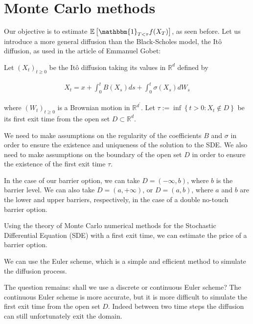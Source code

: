 \section{Monte Carlo methods}

Our objective is to estimate $\mathbb{E}\left[\mathbbm{1}_{T < \tau} f(X_T)\right]$, as seen before.
Let us introduce a more general diffusion than the Black-Scholes model, the Itô diffusion, as used in the article of Emmanuel Gobet:

Let $\left(X_{t}\right)_{t \geq 0}$ be the Itô diffusion taking its values in $\mathbb{R}^{d}$ defined by

$$
\begin{aligned}
X_{t}=x+\int_{0}^{t} B\left(X_{s}\right) d s+\int_{0}^{t} \sigma\left(X_{s}\right) d W_{s}
\end{aligned}
$$

where $\left(W_{t}\right)_{t \geq 0}$ is a Brownian motion in $\mathbb{R}^{d^{\prime}}$. Let $\tau:=\inf \left\{t>0: X_{t} \notin D\right\}$ be its first exit time from the open set $D \subset \mathbb{R}^{d}$. 

We need to make assumptions on the regularity of the coefficients $B$ and $\sigma$ in order to ensure the existence and uniqueness of the solution to the SDE. We also need to make assumptions on the boundary of the open set $D$ in order to ensure the existence of the first exit time $\tau$.

In the case of our barrier option, we can take $D = (-\infty, b)$, where $b$ is the barrier level. We can also take $D = (a, +\infty)$, or $D = (a, b)$, where $a$ and $b$ are the lower and upper barriers, respectively, in the case of a double no-touch barrier option.


Using the theory of Monte Carlo numerical methods for the Stochastic Differential Equation (SDE) with a first exit time, we can estimate the price of a barrier option.

We can use the Euler scheme, which is a simple and efficient method to simulate the diffusion process.

The question remains: shall we use a discrete or continuous Euler scheme? The continuous Euler scheme is more accurate, but it is more difficult to simulate the first exit time from the open set $D$.
Indeed between two time steps the diffusion can still unfortunately exit the domain.

